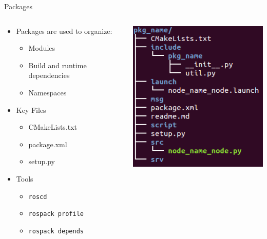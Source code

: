 \documentclass{beamer}
\begin{document}
\begin{frame}{Packages}
\begin{columns}
	\begin{column}{0.6\textwidth}
		\begin{itemize}
			\item Packages are used to organize:
			\begin{itemize}
				\item Modules
				\item Build and runtime dependencies
				\item Namespaces
			\end{itemize}
			\item Key Files
				\begin{itemize}
					\item CMakeLists.txt
					\item package.xml
					\item setup.py
				\end{itemize}
			\item Tools
				\begin{itemize}
					\item \texttt{roscd}
					\item \texttt{rospack profile}
					\item \texttt{rospack depends}
				\end{itemize}
		\end{itemize}
	\end{column}
	\begin{column}{0.4\textwidth}
		\centering
		\includegraphics[width=\textwidth]{fig/pkg_tree.png}
	\end{column}
\end{columns}
\end{frame}
\end{document}
